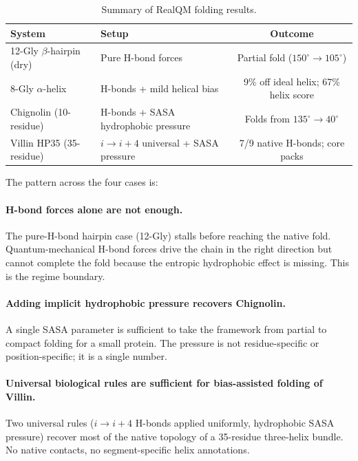 \begin{table}[h]
\centering\small
\caption{Summary of RealQM folding results.}\label{tab:folding}
\begin{tabular}{l l c}
\toprule
System & Setup & Outcome \\
\midrule
12-Gly $\beta$-hairpin (dry)  & Pure H-bond forces                            & Partial fold ($150^\circ \to 105^\circ$) \\
8-Gly $\alpha$-helix          & H-bonds + mild helical bias                  & 9\% off ideal helix; 67\% helix score \\
Chignolin (10-residue)        & H-bonds + SASA hydrophobic pressure           & Folds from $135^\circ \to 40^\circ$ \\
Villin HP35 (35-residue)      & $i \to i{+}4$ universal + SASA pressure       & 7/9 native H-bonds; core packs \\
\bottomrule
\end{tabular}
\end{table}

The pattern across the four cases is:

\paragraph{H-bond forces alone are not enough.} The pure-H-bond hairpin case (12-Gly) stalls before reaching the native fold. Quantum-mechanical H-bond forces drive the chain in the right direction but cannot complete the fold because the entropic hydrophobic effect is missing. This is the regime boundary.

\paragraph{Adding implicit hydrophobic pressure recovers Chignolin.} A single SASA parameter is sufficient to take the framework from partial to compact folding for a small protein. The pressure is not residue-specific or position-specific; it is a single number.

\paragraph{Universal biological rules are sufficient for bias-assisted folding of Villin.} Two universal rules ($i \to i{+}4$ H-bonds applied uniformly, hydrophobic SASA pressure) recover most of the native topology of a 35-residue three-helix bundle. No native contacts, no segment-specific helix annotations.

